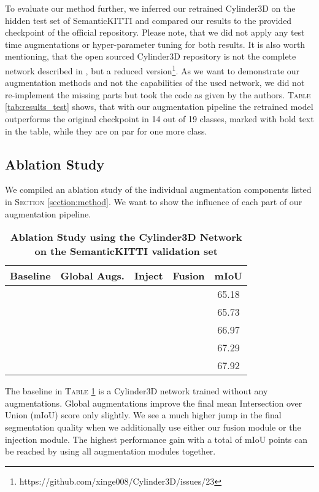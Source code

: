 \documentclass[letterpaper, 10 pt, conference]{ieeeconf}
\begin{document}
To evaluate our method further, we inferred our retrained Cylinder3D on the hidden test set of SemanticKITTI \cite{behley2019semantickitti} and compared our results to the provided checkpoint of the official repository. Please note, that we did not apply any test time augmentations or hyper-parameter tuning for both results. It is also worth mentioning, that the open sourced Cylinder3D repository is not the complete network described in \cite{zhou2020cylinder3d}, but a reduced version\footnote{https://github.com/xinge008/Cylinder3D/issues/23}. As we want to demonstrate our augmentation methods and not the capabilities of the used network, we did not re-implement the missing parts but took the code as given by the authors. \textsc{Table} \ref{tab:results_test} shows, that with our augmentation pipeline the retrained model outperforms the original checkpoint in 14 out of 19 classes, marked with bold text in the table, while they are on par for one more class.



\subsection{Ablation Study}
We compiled an ablation study of the individual augmentation components listed in \textsc{Section} \ref{section:method}. We want to show the influence of each part of our augmentation pipeline.
\begin{table}[!htbp]
	\caption{\textbf{Ablation Study using the Cylinder3D Network on the SemanticKITTI validation set}}
	\begin{tabular}{cccc|c}
		\hline
		Baseline & Global Augs. & Inject & Fusion & mIoU \\
		\hline
		\checkmark &            &            &            & 65.18 \\
		\checkmark & \checkmark &            &            & 65.73 \\
		\checkmark & \checkmark & \checkmark &            & 66.97 \\
		\checkmark & \checkmark &            & \checkmark & 67.29 \\
		\checkmark & \checkmark & \checkmark & \checkmark & 67.92 \\
		\hline
	\end{tabular}
	\centering
	\label{tab:ablation}
\end{table}
The baseline in \textsc{Table} \ref{tab:ablation} is a Cylinder3D network trained without any augmentations. Global augmentations improve the final mean Intersection over Union (mIoU) score only slightly. We see a much higher jump in the final segmentation quality when we additionally use either our fusion module or the injection module. The highest performance gain with a total of  mIoU points can be reached by using all augmentation modules together.
\end{document}
